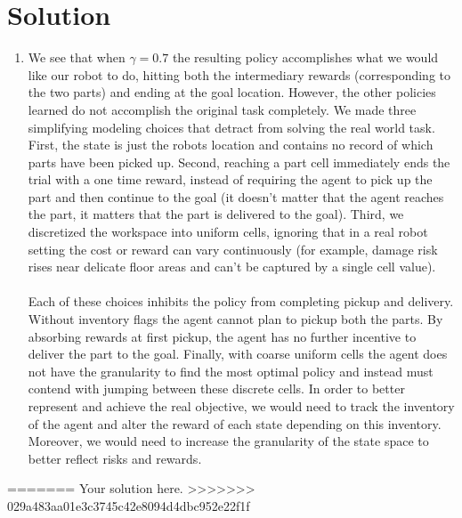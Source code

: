 \documentclass[submit]{../harvardml}
\newenvironment{solution}
  {\color{blue}\section*{Solution}}
{}
\begin{document}
\begin{solution}
\begin{enumerate}
        \item We see that when $\gamma = 0.7$ the resulting policy accomplishes what we would like our robot to do, hitting both the intermediary rewards (corresponding to the two parts) and ending at the goal location. However, the other policies learned do not accomplish the original task completely. We made three simplifying modeling choices that detract from solving the real world task. First, the state is just the robots location and contains no record of which parts have been picked up. Second, reaching a part cell immediately ends the trial with a one time reward, instead of requiring the agent to pick up the part and then continue to the goal (it doesn't matter that the agent reaches the part, it matters that the part is delivered to the goal). Third, we discretized the workspace into uniform cells, ignoring that in a real robot setting the cost or reward can vary continuously (for example, damage risk rises near delicate floor areas and can’t be captured by a single cell value). 
        \\
        \\
        Each of these choices inhibits the policy from completing pickup and delivery. Without inventory flags the agent cannot plan to pickup both the parts. By absorbing rewards at first pickup, the agent has no further incentive to deliver the part to the goal. Finally, with coarse uniform cells the agent does not have the granularity to find the most optimal policy and instead must contend with jumping between these discrete cells. In order to better represent and achieve the real objective, we would need to track the inventory of the agent and alter the reward of each state depending on this inventory. Moreover, we would need to increase the granularity of the state space to better reflect risks and rewards.
        
        


    \end{enumerate}
=======
	Your solution here.
>>>>>>> 029a483aa01e3c3745c42e8094d4dbc952e22f1f
\end{solution}
\end{document}
